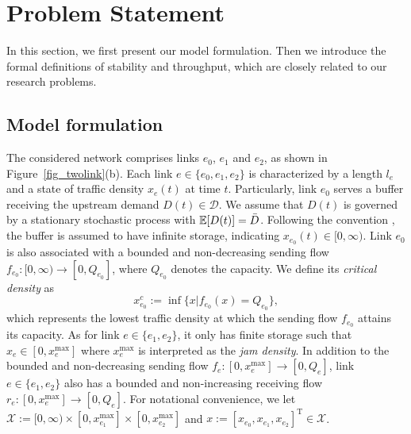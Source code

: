 \section{Problem Statement}
In this section, we first present our model formulation. Then we introduce the formal definitions of stability and throughput, which are closely related to our research problems. 

\subsection{Model formulation}

The considered network comprises links $e_0$, $e_1$ and $e_2$, as shown in Figure~\ref{fig_twolink}(b). Each link $e\in\{e_0,e_1,e_2\}$ is characterized by a length $l_e$ and a state of traffic density $x_e(t)$ at time $t$. Particularly, link $e_0$ serves a buffer receiving the upstream demand $D(t)\in\mathcal{D}$. We assume that $D(t)$ is governed by a stationary stochastic process with $\mathbb{E}[D(t)]=\Bar{D}$. Following the convention \cite{daganzo1995cell}, the buffer is assumed to have infinite storage, indicating $x_{e_0}(t)\in [0, \infty)$. Link $e_0$ is also associated with a bounded and non-decreasing sending flow $f_{e_0}:[0, \infty)\to[0, Q_{e_0}]$, where $Q_{e_0}$ denotes the capacity. We define its \emph{critical density} as 
\begin{equation}
    x_{e_0}^c:=\inf\{x|f_{e_0}(x)=Q_{e_0}\}, \label{eq_critical}
\end{equation}
which represents the lowest traffic density at which the sending flow $f_{e_0}$ attains its capacity. As for link $e\in\{e_1, e_2\}$, it only has finite storage such that $x_e\in[0, x_e^{\max}]$ where $x_e^{\max}$ is interpreted as the \emph{jam density}. In addition to the bounded and non-decreasing sending flow $f_{e}:[0, x_e^{\max}]\to[0, Q_e]$, link $e\in\{e_1, e_2\}$ also has a bounded and non-increasing receiving flow $r_{e}:[0, x_e^{\max}]\to[0, Q_e]$. For notational convenience, we let 
$\mathcal{X}:=[0,\infty)\times[0, x_{e_1}^{\max}]\times[0, x_{e_2}^{\max}]$ and $x:=[x_{e_0}, x_{e_1}, x_{e_2}]^{\mathrm{T}}\in\mathcal{X}$.

